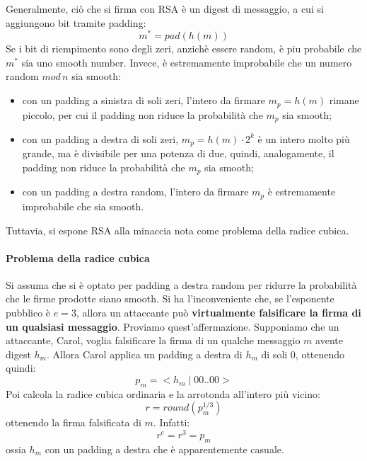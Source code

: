 \newline \newline
Generalmente, ciò che si firma con RSA è un digest di messaggio, a cui si aggiungono bit tramite padding:
\begin{equation}
m^{*} = pad(h(m))
\end{equation} 
Se i bit di riempimento sono degli zeri, anzichè essere random, è piu probabile che $m^*$ sia uno smooth number. Invece, è estremamente improbabile che un numero random $mod \, n$ sia smooth: 
\begin{itemize}
\item con un padding a sinistra di soli zeri, l'intero da firmare $m_{p} = h(m)$ rimane piccolo, per cui il padding non riduce la probabilità che $m_{p}$ sia smooth;
\item con un padding a destra di soli zeri, $m_{p} = h(m) \cdot 2^k $ è un intero molto più grande, ma è divisibile per una potenza di due, quindi, analogamente, il padding non riduce la probabilità che $m_{p}$ sia smooth;
\item con un padding a destra random, l'intero da firmare $m_{p}$ è estremamente improbabile che sia smooth. 
\end{itemize}
Tuttavia, si espone RSA alla minaccia nota come problema della radice cubica.

\paragraph{Problema della radice cubica}
Si assuma che si è optato per padding a destra random per ridurre la probabilità che le firme prodotte siano smooth. Si ha l'inconveniente che, se l'esponente pubblico è $e = 3$, allora un attaccante può \textbf{virtualmente falsificare la firma di un qualsiasi messaggio}. Proviamo quest'affermazione.
\newline \newline
Supponiamo che un attaccante, Carol, voglia falsificare la firma di un qualche messaggio $m$ avente digest $h_{m}$. Allora Carol applica un padding a destra di $h_{m}$ di soli 0, ottenendo quindi:
\begin{equation}
p_{m} = <h_{m} \mid 00..00>
\end{equation}
Poi calcola la radice cubica ordinaria e la arrotonda all'intero più vicino:
\begin{equation}
r = round(p_{m}^{1/3})
\end{equation} 
ottenendo la firma falsificata di $m$. Infatti:
\begin{equation}
r^e = r^3 = p_{m}
\end{equation} 
ossia $h_{m}$ con un padding a destra che è apparentemente casuale.

